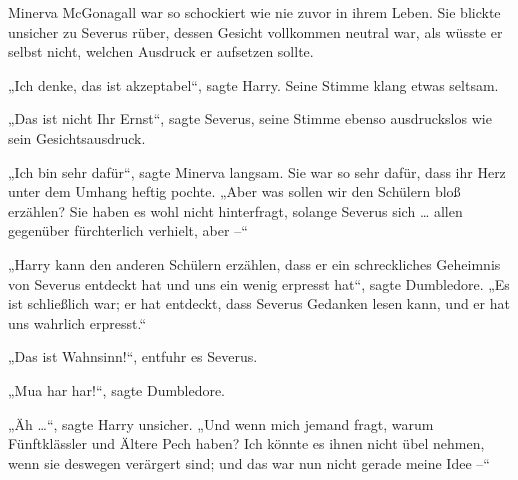 Minerva McGonagall war so schockiert wie nie zuvor in ihrem Leben. Sie blickte unsicher zu Severus rüber, dessen Gesicht vollkommen neutral war, als wüsste er selbst nicht, welchen Ausdruck er aufsetzen sollte. 

„Ich denke, das ist akzeptabel“, sagte Harry. Seine Stimme klang etwas seltsam. 

„Das ist nicht Ihr Ernst“, sagte Severus, seine Stimme ebenso ausdruckslos wie sein Gesichtsausdruck. 

„Ich bin sehr dafür“, sagte Minerva langsam. Sie war so sehr dafür, dass ihr Herz unter dem Umhang heftig pochte. „Aber was sollen wir den Schülern bloß erzählen? Sie haben es wohl nicht hinterfragt, solange Severus sich … allen gegenüber fürchterlich verhielt, aber –“ 

„Harry kann den anderen Schülern erzählen, dass er ein schreckliches Geheimnis von Severus entdeckt hat und uns ein wenig erpresst hat“, sagte Dumbledore. „Es ist schließlich war; er hat entdeckt, dass Severus Gedanken lesen kann, und er hat uns wahrlich erpresst.“ 

„Das ist Wahnsinn!“, entfuhr es Severus. 

„Mua har har!“, sagte Dumbledore. 

„Äh …“, sagte Harry unsicher. „Und wenn mich jemand fragt, warum Fünftklässler und Ältere Pech haben? Ich könnte es ihnen nicht übel nehmen, wenn sie deswegen verärgert sind; und das war nun nicht gerade meine Idee –“ 

